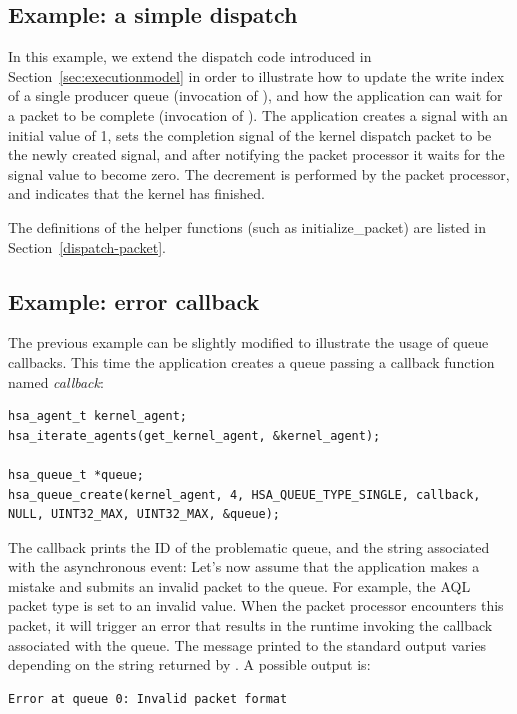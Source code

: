 \documentclass[oneside]{book}
\begin{document}
\subsection{Example: a simple dispatch}
In this example, we extend the dispatch code introduced in
Section~\ref{sec:executionmodel} in order to illustrate how to update the write
index of a single producer queue (invocation of
), and how the application can wait
for a packet to be complete (invocation of
). The application creates a signal with an
initial value of 1, sets the completion signal of the kernel dispatch packet to
be the newly created signal, and after notifying the packet processor it waits
for the signal value to become zero. The decrement is performed by the packet
processor, and indicates that the kernel has finished.


The definitions of the helper functions (such as initialize_packet) are listed
in Section~\ref{dispatch-packet}.

\subsection{Example: error callback}
The previous example can be slightly modified to illustrate the usage of queue
callbacks. This time the application creates a queue passing a callback function
named \emph{callback}:
\begin{lstlisting}
hsa_agent_t kernel_agent;
hsa_iterate_agents(get_kernel_agent, &kernel_agent);

hsa_queue_t *queue;
hsa_queue_create(kernel_agent, 4, HSA_QUEUE_TYPE_SINGLE, callback, NULL, UINT32_MAX, UINT32_MAX, &queue);
\end{lstlisting}

The callback prints the ID of the problematic queue, and the string associated
with the asynchronous event:
Let's now assume that the application makes a mistake and submits an invalid
packet to the queue. For example, the AQL packet type is set to an invalid
value. When the packet processor encounters this packet, it will trigger an
error that results in the runtime invoking the callback associated with the
queue. The message printed to the standard output varies depending on the string
returned by . A possible output is:
\begin{lstlisting}
Error at queue 0: Invalid packet format
\end{lstlisting}
\end{document}
